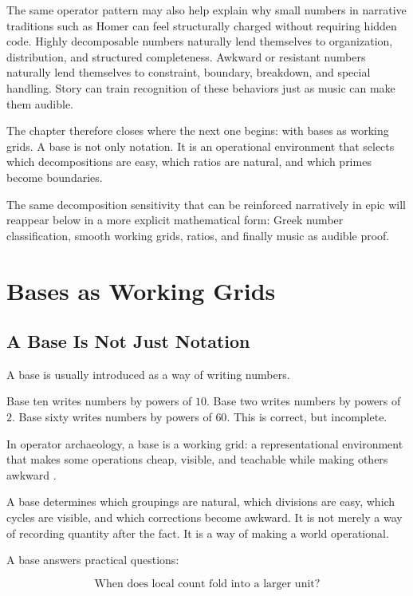 \documentclass[11pt]{book}
\begin{document}
The same operator pattern may also help explain why small numbers in narrative traditions such as Homer can feel structurally charged without requiring hidden code. Highly decomposable numbers naturally lend themselves to organization, distribution, and structured completeness.  Awkward or resistant numbers naturally lend themselves to constraint, boundary, breakdown, and special handling. Story can train recognition of these behaviors just as music can make them audible.

The chapter therefore closes where the next one begins: with bases as working grids. A base is not only notation. It is an operational environment that selects which decompositions are easy, which ratios are natural, and which primes become boundaries.

The same decomposition sensitivity that can be reinforced narratively in epic will reappear below in a more explicit mathematical form: Greek number classification, smooth working grids, ratios, and finally music as audible proof.

\chapter{Bases as Working Grids}

\section{A Base Is Not Just Notation}

A base is usually introduced as a way of writing numbers.

Base ten writes numbers by powers of \(10\). Base two writes numbers by powers of \(2\). Base sixty writes numbers by powers of \(60\). This is correct, but incomplete.

In operator archaeology, a base is a working grid: a representational environment that makes some operations cheap, visible, and teachable while making others awkward \cite{Ifrah2000UniversalHistoryNumbers,Menninger1969NumberWordsSymbols,Robson2008MathematicsAncientIraq}.

A base determines which groupings are natural, which divisions are easy, which cycles are visible, and which corrections become awkward. It is not merely a way of recording quantity after the fact. It is a way of making a world operational.

A base answers practical questions:

\[
\text{When does local count fold into a larger unit?}
\]
\end{document}
